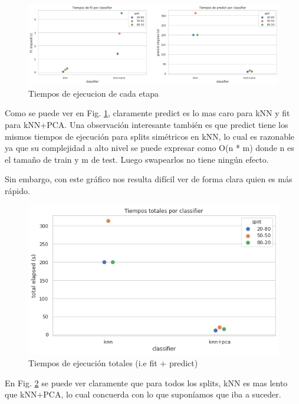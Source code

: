 \documentclass[a4paper]{article}
\begin{document}
    \begin{figure}[H]
            \centering
            \includegraphics[scale=0.425]{img/exp/time/time_by_stage.png}
            \caption{Tiempos de ejecucion de cada etapa}
            \label{fig:time-step}
    \end{figure}
    
    Como se puede ver en Fig. \ref{fig:time-step}, claramente predict es lo mas caro para kNN y fit para kNN+PCA. Una observación interesante también es que predict tiene los mismos tiempos de ejecución para splits simétricos en kNN, lo cual es razonable ya que su complejidad a alto nivel se puede expresar como O(n * m) donde n es el tamaño de train y m de test. Luego swapearlos no tiene ningún efecto.
    
    Sin embargo, con este gráfico nos resulta difícil ver de forma clara quien es más rápido.
    
    \begin{figure}[H]
            \centering
            \includegraphics[scale=0.6]{img/exp/time/time.png}
            \caption{Tiempos de ejecución totales (i.e fit + predict)}
            \label{fig:time-total}
    \end{figure}
    
    En Fig. \ref{fig:time-total} se puede ver claramente que para todos los splits, kNN es mas lento que kNN+PCA, lo cual concuerda con lo que suponíamos que iba a suceder. 
\end{document}
